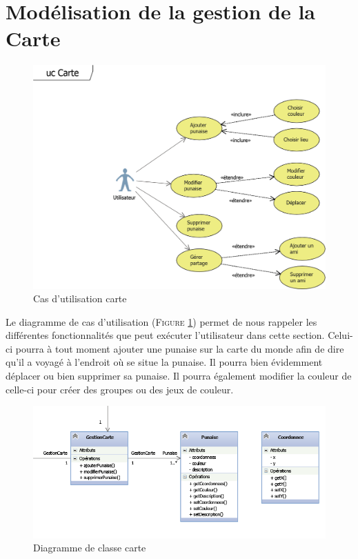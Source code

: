 \documentclass[11pt]{article}
\begin{document}
\section{Modélisation de la gestion de la Carte}
\begin{figure}[!h]
        \centering \includegraphics[scale=1]{ucCarte.png}
        \caption{Cas d'utilisation carte}
         \label{fig:ucCarte}
\end{figure}
Le diagramme de cas d’utilisation  (\textsc{Figure \ref{fig:ucCarte}}) permet de nous rappeler les différentes fonctionnalités que peut exécuter l’utilisateur dans cette section. Celui-ci pourra à tout moment ajouter une punaise sur la carte du monde afin de dire qu’il a voyagé à l’endroit où se situe la punaise. Il pourra bien évidemment déplacer ou bien supprimer sa punaise. Il pourra également modifier la couleur de celle-ci pour créer des groupes ou des jeux de couleur.
\begin{figure}[!h]
        \centering \includegraphics[scale=1]{carte.png}
        \caption{Diagramme de classe carte}
         \label{fig:carte}
\end{figure}
\end{document}
